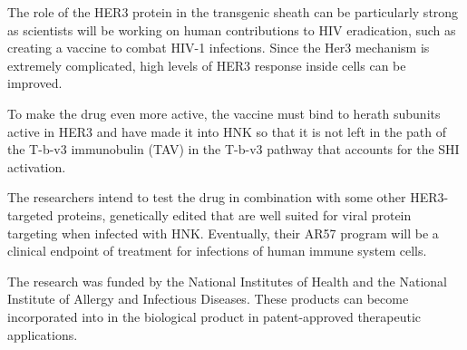 \documentclass{article}
\begin{document}
The role of the HER3 protein in the transgenic sheath can be particularly strong as scientists will be working on human contributions to HIV eradication, such as creating a vaccine to combat HIV-1 infections. Since the Her3 mechanism is extremely complicated, high levels of HER3 response inside cells can be improved.

To make the drug even more active, the vaccine must bind to herath subunits active in HER3 and have made it into HNK so that it is not left in the path of the T-b-v3 immunobulin (TAV) in the T-b-v3 pathway that accounts for the SHI activation.

The researchers intend to test the drug in combination with some other HER3-targeted proteins, genetically edited that are well suited for viral protein targeting when infected with HNK. Eventually, their AR57 program will be a clinical endpoint of treatment for infections of human immune system cells.

The research was funded by the National Institutes of Health and the National Institute of Allergy and Infectious Diseases. These products can become incorporated into in the biological product in patent-approved therapeutic applications.
\end{document}
